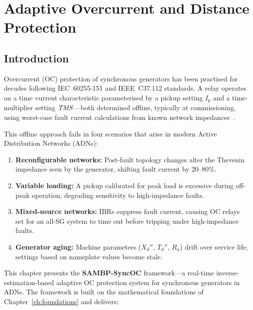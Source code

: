 \chapter{Adaptive Overcurrent and Distance Protection}
\label{ch:oc_distance}
\label{ch:generator_oc}
\label{ch:distance}

\section{Introduction}
\label{sec:ch5_intro}

Overcurrent (OC) protection of synchronous generators has been practised
for decades following IEC~60255-151 and IEEE~C37.112 standards. A relay
operates on a time--current characteristic parameterised by a pickup setting
$I_p$ and a time-multiplier setting $\mathit{TMS}$---both determined offline,
typically at commissioning, using worst-case fault current calculations
from known network impedances~\citep{Blackburn2006}.

This offline approach fails in four scenarios that arise in modern Active
Distribution Networks (ADNs):
\begin{enumerate}
\item \textbf{Reconfigurable networks:} Post-fault topology changes alter
      the Thevenin impedance seen by the generator, shifting fault current
      by 20--80\%.
\item \textbf{Variable loading:} A pickup calibrated for peak load is
      excessive during off-peak operation, degrading sensitivity to
      high-impedance faults.
\item \textbf{Mixed-source networks:} IBRs suppress fault current,
      causing OC relays set for an all-SG system to time out before
      tripping under high-impedance faults.
\item \textbf{Generator aging:} Machine parameters ($X_d''$, $T_d''$, $R_a$)
      drift over service life; settings based on nameplate values become stale.
\end{enumerate}

This chapter presents the \textbf{SAMBP-SyncOC} framework---a real-time
inverse-estimation-based adaptive OC protection system for synchronous
generators in ADNs. The framework is built on the mathematical foundations
of Chapter~\ref{ch:foundations} and delivers:

